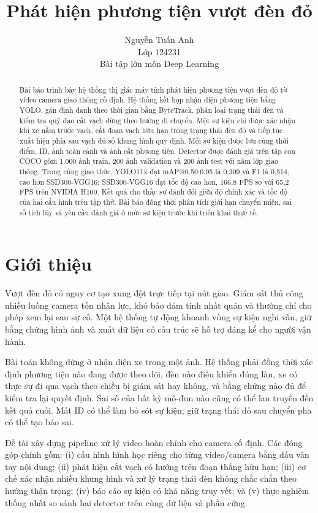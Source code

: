 \documentclass[11pt,a4paper]{article}
\title{Phát hiện phương tiện vượt đèn đỏ}
\author{Nguyễn Tuấn Anh \\
Lớp 124231 \\
Bài tập lớn môn Deep Learning}
\begin{document}
\maketitle
\pagestyle{plain}
\thispagestyle{plain}

\renewcommand{\abstractname}{Abstract}
\begin{abstract}
Bài báo trình bày hệ thống thị giác máy tính phát hiện phương tiện vượt đèn đỏ từ video camera giao thông cố định. Hệ thống kết hợp nhận diện phương tiện bằng YOLO, gán định danh theo thời gian bằng ByteTrack, phân loại trạng thái đèn và kiểm tra quỹ đạo cắt vạch dừng theo hướng di chuyển. Một sự kiện chỉ được xác nhận khi xe nằm trước vạch, cắt đoạn vạch hữu hạn trong trạng thái đèn đỏ và tiếp tục xuất hiện phía sau vạch đủ số khung hình quy định. Mỗi sự kiện được lưu cùng thời điểm, ID, ảnh toàn cảnh và ảnh cắt phương tiện. Detector được đánh giá trên tập con COCO gồm 1.000 ảnh train, 200 ảnh validation và 200 ảnh test với năm lớp giao thông. Trong cùng giao thức, YOLO11x đạt mAP@0.50:0.95 là 0,309 và F1 là 0,514, cao hơn SSD300-VGG16; SSD300-VGG16 đạt tốc độ cao hơn, 166,8 FPS so với 65,2 FPS trên NVIDIA H100. Kết quả cho thấy sự đánh đổi giữa độ chính xác và tốc độ của hai cấu hình trên tập thử. Bài báo đồng thời phân tích giới hạn chuyển miền, sai số tích lũy và yêu cầu đánh giá ở mức sự kiện trước khi triển khai thực tế.
\end{abstract}

\section{Giới thiệu}
Vượt đèn đỏ có nguy cơ tạo xung đột trực tiếp tại nút giao. Giám sát thủ công nhiều luồng camera tốn nhân lực, khó bảo đảm tính nhất quán và thường chỉ cho phép xem lại sau sự cố. Một hệ thống tự động khoanh vùng sự kiện nghi vấn, giữ bằng chứng hình ảnh và xuất dữ liệu có cấu trúc sẽ hỗ trợ đáng kể cho người vận hành.

Bài toán không dừng ở nhận diện xe trong một ảnh. Hệ thống phải đồng thời xác định phương tiện nào đang được theo dõi, đèn nào điều khiển đúng làn, xe có thực sự đi qua vạch theo chiều bị giám sát hay không, và bằng chứng nào đủ để kiểm tra lại quyết định. Sai số của bất kỳ mô-đun nào cũng có thể lan truyền đến kết quả cuối. Mất ID có thể làm bỏ sót sự kiện; giữ trạng thái đỏ sau chuyển pha có thể tạo báo sai.

Đề tài xây dựng pipeline xử lý video hoàn chỉnh cho camera cố định. Các đóng góp chính gồm: (i) cấu hình hình học riêng cho từng video/camera bằng dấu vân tay nội dung; (ii) phát hiện cắt vạch có hướng trên đoạn thẳng hữu hạn; (iii) cơ chế xác nhận nhiều khung hình và xử lý trạng thái đèn không chắc chắn theo hướng thận trọng; (iv) báo cáo sự kiện có khả năng truy vết; và (v) thực nghiệm thống nhất so sánh hai detector trên cùng dữ liệu và phần cứng.
\end{document}
